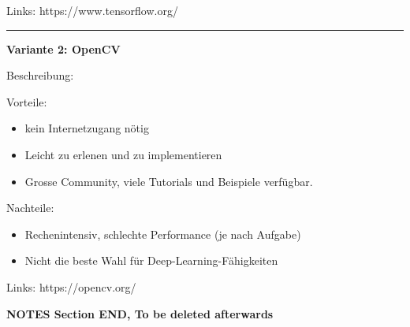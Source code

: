 Links: https://www.tensorflow.org/

\vspace{5pt}
\hrule

\textbf{Variante 2: OpenCV}

Beschreibung:

Vorteile:
\begin{itemize}
    \item kein Internetzugang nötig
    \item Leicht zu erlenen und zu implementieren
    \item Grosse Community, viele Tutorials und Beispiele verfügbar.
\end{itemize}

Nachteile:
\begin{itemize}
    \item Rechenintensiv, schlechte Performance (je nach Aufgabe)
    \item Nicht die beste Wahl für Deep-Learning-Fähigkeiten
\end{itemize}
Links: https://opencv.org/

\begin{Huge}
\textbf{NOTES Section END, To be deleted afterwards}
\end{Huge}





